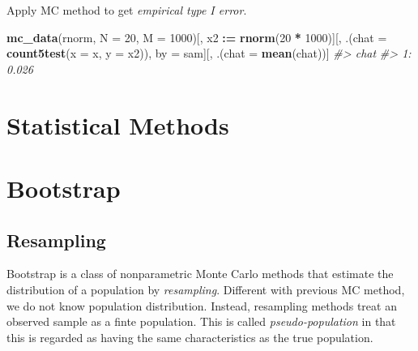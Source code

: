 \documentclass[]{book}
\newenvironment{Shaded}{\begin{snugshade}}{\end{snugshade}}
\newcommand{\CommentTok}[1]{\textcolor[rgb]{0.56,0.35,0.01}{\textit{#1}}}
\newcommand{\DataTypeTok}[1]{\textcolor[rgb]{0.13,0.29,0.53}{#1}}
\newcommand{\DecValTok}[1]{\textcolor[rgb]{0.00,0.00,0.81}{#1}}
\newcommand{\ErrorTok}[1]{\textcolor[rgb]{0.64,0.00,0.00}{\textbf{#1}}}
\newcommand{\KeywordTok}[1]{\textcolor[rgb]{0.13,0.29,0.53}{\textbf{#1}}}
\newcommand{\NormalTok}[1]{#1}
\newcommand{\OperatorTok}[1]{\textcolor[rgb]{0.81,0.36,0.00}{\textbf{#1}}}
\newcommand{\StringTok}[1]{\textcolor[rgb]{0.31,0.60,0.02}{#1}}
\theoremstyle{definition}
\theoremstyle{definition}
\theoremstyle{definition}
\theoremstyle{remark}
\begin{document}
Apply MC method to get \emph{empirical type I error}.

\begin{Shaded}
\begin{Highlighting}[]
\KeywordTok{mc_data}\NormalTok{(rnorm, }\DataTypeTok{N =} \DecValTok{20}\NormalTok{, }\DataTypeTok{M =} \DecValTok{1000}\NormalTok{)[,}
\NormalTok{                                 x2 }\OperatorTok{:}\ErrorTok{=}\StringTok{ }\KeywordTok{rnorm}\NormalTok{(}\DecValTok{20} \OperatorTok{*}\StringTok{ }\DecValTok{1000}\NormalTok{)][,}
\NormalTok{                                                         .(}\DataTypeTok{chat =} \KeywordTok{count5test}\NormalTok{(}\DataTypeTok{x =}\NormalTok{ x, }\DataTypeTok{y =}\NormalTok{ x2)),}
\NormalTok{                                                         by =}\StringTok{ }\NormalTok{sam][,}
\NormalTok{                                                                   .(}\DataTypeTok{chat =} \KeywordTok{mean}\NormalTok{(chat))]}
\CommentTok{#>     chat}
\CommentTok{#> 1: 0.026}
\end{Highlighting}
\end{Shaded}

\hypertarget{statistical-methods}{%
\section{Statistical Methods}\label{statistical-methods}}

\hypertarget{bootstrap}{%
\section{Bootstrap}\label{bootstrap}}

\hypertarget{resampling}{%
\subsection{Resampling}\label{resampling}}

Bootstrap is a class of nonparametric Monte Carlo methods that estimate the distribution of a population by \emph{resampling}. Different with previous MC method, we do not know population distribution. Instead, resampling methods treat an observed sample as a finte population. This is called \emph{pseudo-population} in that this is regarded as having the same characteristics as the true population.
\end{document}
